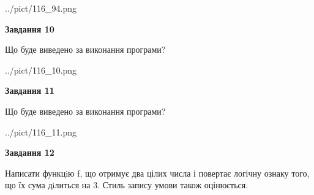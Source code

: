 \documentclass[12pt, ukrainian]{article}
\begin{document}
{\begin {large}
\begin{center}
	{../pict/116_94.png}
\end{center}
\newpage

{\begin {center}\textbf{Завдання 10}\end {center}}

Що буде виведено за виконання програми?\par
\begin{center}
	{../pict/116_10.png}
\end{center}
\newpage

{\begin {center}\textbf{Завдання 11}\end {center}}

Що буде виведено за виконання програми?\par
\begin{center}
	{../pict/116_11.png}
\end{center}
\newpage

{\begin {center}\textbf{Завдання 12}\end {center}}


Написати функцiю f, що отримує два цілих числа і повертає логічну ознаку того, що їх сума дiлиться на 3. Стиль запису умови також оцінюється.\par
\newpage

\end {large}}
\end{document}
